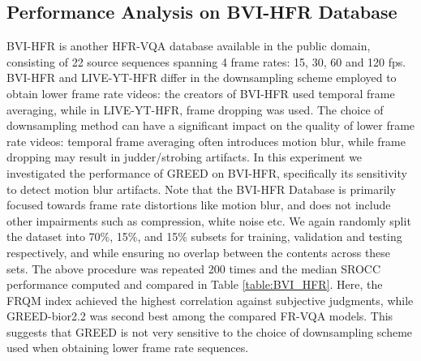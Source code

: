 \documentclass[journal]{IEEEtran}
\begin{document}
\subsection{Performance Analysis on BVI-HFR Database}
BVI-HFR \cite{mackin2018study} is another HFR-VQA database available in the public domain, consisting of 22 source sequences spanning 4 frame rates: 15, 30, 60 and 120 fps. BVI-HFR and LIVE-YT-HFR differ in the downsampling scheme employed to obtain lower frame rate videos: the creators of BVI-HFR used temporal frame averaging, while in LIVE-YT-HFR, frame dropping was used. The choice of downsampling method can have a significant impact on the quality of lower frame rate videos: temporal frame averaging often introduces motion blur, while frame dropping may result in judder/strobing artifacts. In this experiment we investigated the performance of GREED on BVI-HFR, specifically its sensitivity to detect motion blur artifacts. Note that the BVI-HFR Database is primarily focused towards frame rate distortions like motion blur, and does not include other impairments such as compression, white noise etc. We again randomly split the dataset into 70\%, 15\%, and 15\% subsets for training, validation and testing respectively, and while ensuring no overlap between the contents across these sets. The above procedure was repeated 200 times and the median SROCC performance computed and compared in Table \ref{table:BVI_HFR}. Here, the FRQM index achieved the highest correlation against subjective judgments, while GREED-bior2.2 was second best among the compared FR-VQA models. This suggests that GREED is not very sensitive to the choice of downsampling scheme used when obtaining lower frame rate sequences.
\end{document}
